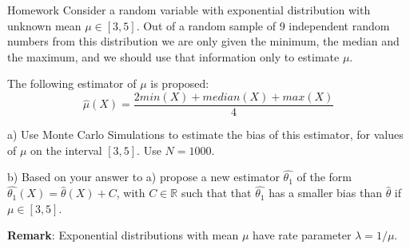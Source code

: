 \documentclass[8pt]{beamer}
\begin{document}
\begin{frame}{Homework}
Consider a random variable with exponential distribution with unknown mean $\mu \in [3,5]$. Out of a random sample of 9 independent random numbers from this distribution we are only given the minimum, the median and the maximum, and we should use that information only to estimate $\mu$.

\vspace{1mm}

The following estimator of $\mu$ is proposed:
\begin{equation*}
	\hat{\mu}(X)=\frac{2min(X)+median(X)+max(X)}{4}
\end{equation*}

a) Use Monte Carlo Simulations to estimate the bias of this estimator, for values of $\mu$ on the interval $[3,5]$. Use $N=1000$.

\vspace{1mm}

b) Based on your answer to a) propose a new estimator $\hat{\theta_1}$  of the form $\hat{\theta_1}(X)=\hat{\theta}(X)+C$, with $C\in \mathbb{R}$ such that that $\hat{\theta_1}$ has a smaller bias than $\hat{\theta}$ if $\mu \in [3,5]$.

\vspace{1mm}

\textbf{Remark}: Exponential distributions with mean $\mu$ have rate parameter $\lambda=1/\mu$.
\end{frame}
\end{document}
